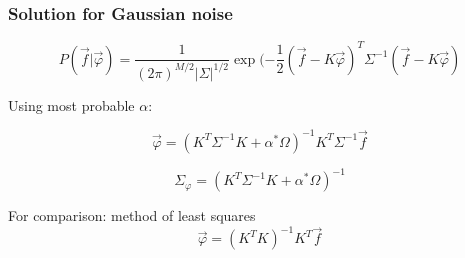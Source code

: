 \documentclass[8pt,pdf,hyperref={unicode}]{beamer}
\begin{document}
\begin{frame}
    \frametitle{Solution for Gaussian noise}
{\LARGE     $$
    P(\vec{f}|\vec{\varphi}) = \frac{1}{(2\pi)^{M/2}|\Sigma|^{1/2}} \exp(-\frac{1}{2}(\vec{f} - K\vec{\varphi})^T\Sigma^{-1}(\vec{f} - K\vec{\varphi})
    $$}
    
    
    \begin{block}{Using most probable $\alpha$:}
{\LARGE         $$
        \vec{\varphi}= (K^T\Sigma^{-1}K+\alpha^*\Omega)^{-1}K^T\Sigma^{-1}\vec{f}
        $$
        
        $$
        \Sigma_{\varphi} = (K^T\Sigma^{-1}K+\alpha^*\Omega)^{-1}
        $$}
    \end{block}
    \begin{block}{For comparison: method of least squares}
{\LARGE         $$
        \vec{\varphi} = (K^{T}K)^{-1}K^{T}\vec{f}
        $$}
    \end{block}
\end{frame}
\end{document}
